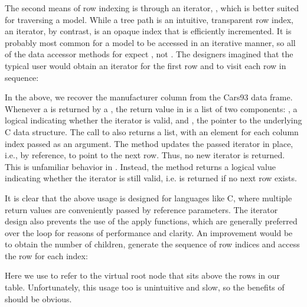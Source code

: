 The second means of row indexing is through an iterator,
, which is better suited for traversing a model.
While a tree path is an intuitive, transparent row index, an iterator,
by contrast, is an opaque index that is efficiently incremented. It is
probably most common for a model to be accessed in an iterative
manner, so all of the data accessor methods for 
expect , not . The \GTK\/
designers imagined that the typical user would obtain an iterator for
the first row and to visit each row in sequence:
\begin{Schunk}
\end{Schunk}
%
In the above, we recover the manufacturer column from the Cars93 data
frame. Whenever a  is returned by a
, the return value in \R\/ is a list of two
components: , a logical indicating whether the iterator
is valid, and , the pointer to the underlying C data
structure. The call to  also returns a list,
with an element for each column index passed as an argument. The
method  updates the passed iterator in
place, i.e., by reference, to point to the next row. Thus, no new
iterator is returned. This is unfamiliar behavior in \R. Instead, the
method returns a logical value indicating whether the iterator is
still valid, i.e.  is returned if no next row exists.

It is clear that the above usage is designed for languages like C,
where multiple return values are conveniently passed by reference
parameters. The iterator design also prevents the use of the apply
functions, which are generally preferred over the  loop
for reasons of performance and clarity. An improvement would be to
obtain the number of children, generate the sequence of row indices
and access the row for each index:
\begin{Schunk}
\end{Schunk}
%
Here we use  to refer to the virtual root node that sits
above the rows in our table. Unfortunately, this usage too is
unintuitive and slow, so the benefits of  should
be obvious.

